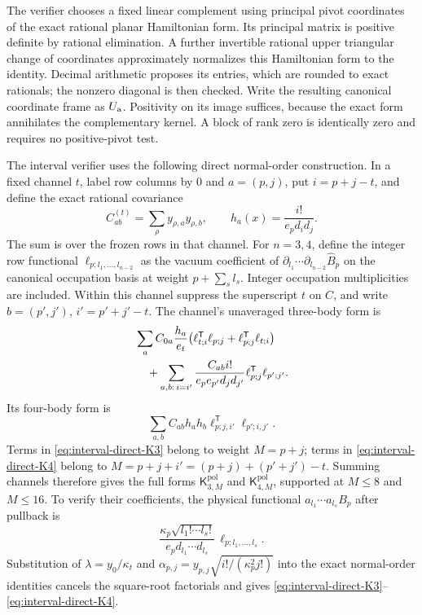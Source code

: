 \documentclass[11pt]{article}
\begin{document}
The verifier chooses a fixed linear complement using principal pivot
coordinates of the exact rational planar Hamiltonian form. Its principal
matrix is positive definite by rational elimination. A further invertible
rational upper triangular change of coordinates approximately normalizes
this Hamiltonian form to the identity. Decimal arithmetic proposes its
entries, which are rounded to exact rationals; the nonzero diagonal is
then checked. Write the resulting canonical coordinate frame as
$U_{\rm a}$. Positivity on its image suffices, because the exact form
annihilates the complementary kernel. A block of rank zero is identically
zero and requires no positive-pivot test.

The interval verifier uses the following direct normal-order construction.
In a fixed channel $t$, label row columns by $0$ and
$a=(p,j)$, put $i=p+j-t$, and define the exact rational covariance
\begin{equation}\label{eq:interval-row-covariance}
 C_{ab}^{(t)}=\sum_\rho y_{\rho,a}y_{\rho,b},
 \qquad h_a(x)=\frac{i!}{e_p d_i d_j}.
\end{equation}
The sum is over the frozen rows in that channel. For $n=3,4$, define the
integer row functional $\ell_{p;l_1,\ldots,l_{n-2}}$ as the vacuum
coefficient of
$\partial_{l_1}\cdots\partial_{l_{n-2}}\widehat B_p$ on the canonical
occupation basis at weight $p+\sum_s l_s$. Integer occupation
multiplicities are included. Within this channel suppress the superscript
$t$ on $C$, and write $b=(p',j')$, $i'=p'+j'-t$. The channel's
unaveraged three-body form is
\begin{align}\label{eq:interval-direct-K3}
 &\sum_a C_{0a}\frac{h_a}{e_t}
   \big(\ell_{t;i}^{\mathsf T}\ell_{p;j}
         +\ell_{p;j}^{\mathsf T}\ell_{t;i}\big)\notag\\
 &\quad+\sum_{a,b:\,i=i'}
    \frac{C_{ab}i!}{e_p e_{p'}d_jd_{j'}}
       \ell_{p;j}^{\mathsf T}\ell_{p';j'}.
\end{align}
Its four-body form is
\begin{equation}\label{eq:interval-direct-K4}
 \sum_{a,b}C_{ab}h_ah_b
       \ell_{p;j,i'}^{\mathsf T}\ell_{p';i,j'}.
\end{equation}
Terms in \eqref{eq:interval-direct-K3} belong to weight $M=p+j$;
terms in \eqref{eq:interval-direct-K4} belong to
$M=p+j+i'=(p+j)+(p'+j')-t$. Summing channels therefore gives the full
forms $\mathsf K^{\mathrm{pol}}_{3,M}$ and
$\mathsf K^{\mathrm{pol}}_{4,M}$, supported at $M\le8$ and $M\le16$.
To verify their coefficients, the physical functional
$a_{l_1}\cdots a_{l_s}B_p$ after pullback is
\begin{equation}
 \frac{\kappa_p\sqrt{l_1!\cdots l_s!}}
 {e_p d_{l_1}\cdots d_{l_s}}\,\ell_{p;l_1,\ldots,l_s}.
\end{equation}
Substitution of $\lambda=y_0/\kappa_t$ and
$\alpha_{p,j}=y_{p,j}\sqrt{i!/(\kappa_p^2j!)}$ into the exact
normal-order identities cancels the square-root factorials and gives
\eqref{eq:interval-direct-K3}--\eqref{eq:interval-direct-K4}.
\end{document}
